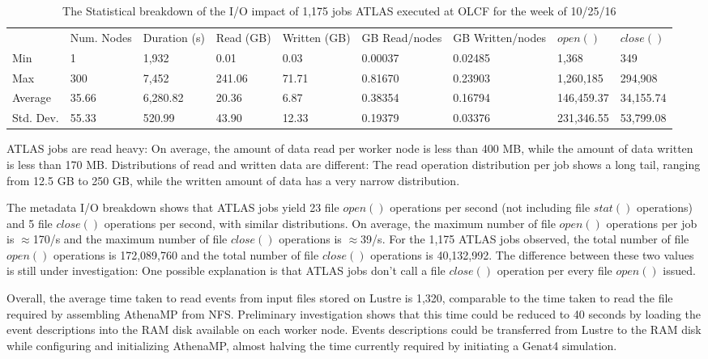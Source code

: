\begin{table}[t]
\centering
\begin{tabular}{lllllllll} & Num. Nodes & Duration (s) & Read (GB) & Written
 (GB) & GB Read/nodes & GB Written/nodes & $open()$ & $close()$ \\ Min & 1 &
 1,932 & 0.01 & 0.03 & 0.00037 & 0.02485 & 1,368 & 349 \\ Max & 300 & 7,452 &
 241.06 & 71.71 & 0.81670 & 0.23903 & 1,260,185 & 294,908 \\ Average & 35.66
 & 6,280.82 & 20.36 & 6.87 & 0.38354 & 0.16794 & 146,459.37 & 34,155.74 \\
 Std. Dev. & 55.33 & 520.99 & 43.90 & 12.33 & 0.19379 & 0.03376 & 231,346.55
 & 53,799.08
\end{tabular}
\caption{The Statistical breakdown of the I/O impact of 1,175 jobs ATLAS
executed at OLCF for the week of 10/25/16}
\label{panda-olcf-stats}
\end{table}

ATLAS jobs are read heavy: On average, the amount of data read per worker
node is less than 400 MB, while the amount of data written is less than 170
MB\@. Distributions of read and written data are different: The read
operation distribution per job shows a long tail, ranging from 12.5 GB to 250
GB, while the written amount of data has a very narrow distribution.

The metadata I/O breakdown shows that ATLAS jobs yield 23 file $open()$
operations per second (not including file $stat()$ operations) and 5 file
$close()$ operations per second, with similar distributions. On average, the
maximum number of file $open()$ operations per job is $\approx$170/s and the
maximum number of file $close()$ operations is $\approx$39/s. For the 1,175
ATLAS jobs observed, the total number of file $open()$ operations is
172,089,760 and the total number of file $close()$ operations is 40,132,992.
The difference between these two values is still under investigation: One
possible explanation is that ATLAS jobs don't call a file $close()$ operation
per every file $open()$ issued.

Overall, the average time taken to read events from input files stored on
Lustre is 1,320, comparable to the time taken to read the file required by
assembling AthenaMP from NFS. Preliminary investigation shows that this time
could be reduced to 40 seconds by loading the event descriptions into the RAM
disk available on each worker node. Events descriptions could be transferred
from Lustre to the RAM disk while configuring and initializing AthenaMP,
almost halving the time currently required by initiating a Genat4 simulation.
